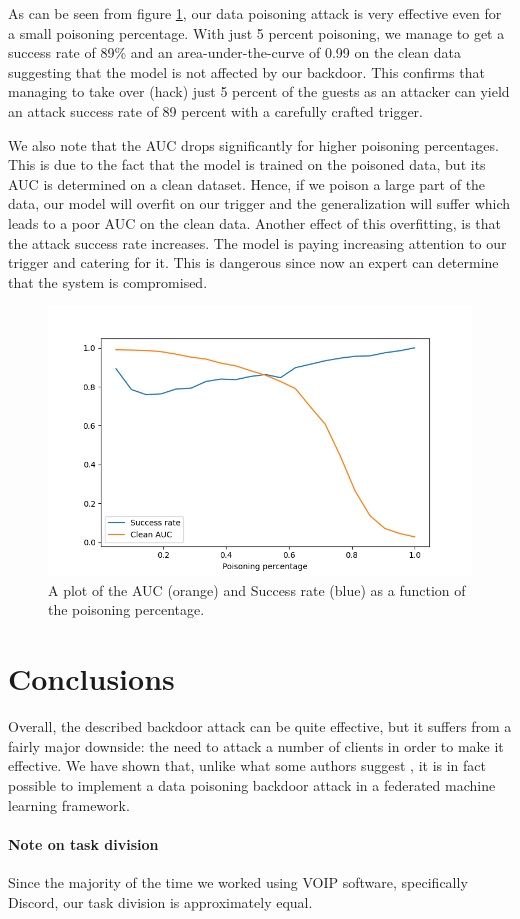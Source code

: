\documentclass{article}
\begin{document}
As can be seen from figure \ref{fig:mesh2}, our data poisoning attack is very effective even for a small poisoning percentage. With just 5 percent poisoning, we manage to get a success rate of 89\% and an area-under-the-curve \cite{enwiki:1053047561} of 0.99 on the clean data suggesting that the model is not affected by our backdoor. This confirms that managing to take over (hack) just 5 percent of the guests as an attacker can yield an attack success rate of 89 percent with a carefully crafted trigger.

We also note that the AUC drops significantly for higher poisoning percentages. This is due to the fact that the model is trained on the poisoned data, but its AUC is determined on a clean dataset. Hence, if we poison a large part of the data, our model will overfit on our trigger and the generalization will suffer which leads to a poor AUC on the clean data. Another effect of this overfitting, is that the attack success rate increases. The model is paying increasing attention to our trigger and catering for it. This is dangerous since now an expert can determine that the system is compromised.



\begin{figure}[h]
    \centering
    \includegraphics[scale=0.7]{assets/result_graph.png}
    \caption{A plot of the AUC (orange) and Success rate (blue) as a function of the poisoning percentage.}
    \label{fig:mesh2}
\end{figure}




\section{Conclusions}
Overall, the described backdoor attack can be quite effective, but it suffers from a fairly major downside: the need to attack a number of clients in order to make it effective. We have shown that, unlike what some authors suggest \cite{DBLP:journals/corr/abs-1807-00459}, it is in fact possible to implement a data poisoning backdoor attack in a federated machine learning framework.

\paragraph{Note on task division}
Since the majority of the time we worked using VOIP software, specifically Discord, our task division is approximately equal.

\newpage
\printbibliography
\end{document}
